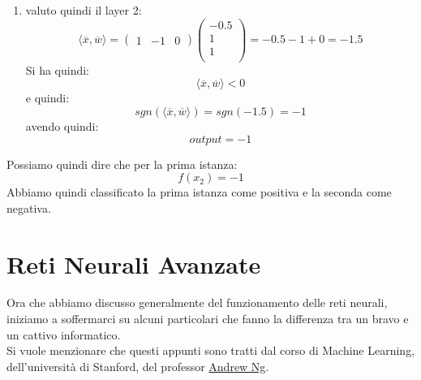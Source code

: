 \begin{esercizio}
\begin{enumerate}
\[\begin{matrix}
									      			      		1    \\
									      			      		1    \\
									      			      	\end{matrix}
									      			      	\right)= -1.5+1+0 = -0.5\]
									      			      	Si ha quindi:
									      			      	\[\langle \overline{x},\overline{w}\rangle< 0\]
									      			      	e quindi:
									      			      	\[sgn(\langle \overline{x},\overline{w}\rangle)=sgn(-0.5)=-1\]
									      			      	avendo quindi:
									      			      	\[y_h=-1\]
									      			      	che sarà tra gli input del secondo layer
									      			      	\item valuto quindi il layer 2:
									      			      	\[\langle \overline{x},\overline{w}\rangle=
									      			      		\left(\begin{matrix}
									      			      		1 & -1 & 0
									      			      		\end{matrix}\right)
									      			      		\left(
									      			      		\begin{matrix}
									      			      			-0.5 \\
									      			      			1    \\
									      			      			1    \\
									      			      		\end{matrix}
									      			      		\right)= -0.5-1+0 = -1.5\]
									      			      		Si ha quindi:
									      			      		\[\langle \overline{x},\overline{w}\rangle < 0\]
									      			      		e quindi:
									      			      		\[sgn(\langle \overline{x},\overline{w}\rangle)=sgn(-1.5)=-1\]
									      			      		avendo quindi:
									      			      		\[output=-1\]
									      			      		\end{enumerate}
									      			      		Possiamo quindi dire che per la prima istanza:
									      			      		\[f(x_2)=-1\]
									      			      		Abbiamo quindi classificato la prima istanza come positiva e la seconda come
									      			      		negativa.
									      			      	
									      			      				\end{esercizio}
									      			      				  \section{Reti Neurali Avanzate}
							Ora che abbiamo discusso generalmente del funzionamento delle reti neurali, iniziamo a soffermarci su alcuni particolari che fanno la differenza tra un bravo e un cattivo informatico.\\ Si vuole menzionare che questi appunti sono tratti dal corso di Machine Learning, dell'università di Stanford, del professor \href{https://scholar.google.com/citations?user=mG4imMEAAAAJ&hl=it&oi=ao}{Andrew Ng}.

